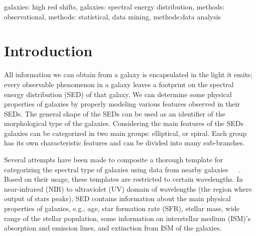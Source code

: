 \documentclass[useAMS,usenatbib]{mn2e}
\begin{document}
\begin{keywords} 
 galaxies: high red shifts, galaxies: spectral energy distribution, methods: observational, methods: statistical, data mining, methods:data analysis
\end{keywords}
\section{Introduction}
\label{sec: intro}
All information we can obtain from a galaxy is encapsulated in the light it emits; every observable phenomenon in a galaxy leaves a footprint on the spectral energy distribution (SED) of that galaxy.
We can determine some physical properties of galaxies by properly modeling various features observed in their SEDs.
The general shape of the SEDs can be used as an identifier of the morphological type of the galaxies.
Considering the main features of the SEDs galaxies can be categorized in two main groups: elliptical, or spiral.
Each group has its own characteristic features and can be divided into many sub-branches.

Several attempts have been made to composite a thorough template for categorizing the spectral type of galaxies using data from nearby galaxies~\citep[e.g.][]{Kinney93}~\citep[][hereafter K96]{Kinney96}~\citep[][]{Bershady00,Mannucci01}. 
Based on their usage, these templates are restricted to certain wavelengths.
In near-infrared (NIR) to ultraviolet (UV) domain of wavelengths (the region where output of stars peaks), SED contains information about the main physical properties of galaxies, e.g., age, star formation rate (SFR), stellar mass, wide range of the stellar population, some information on interstellar medium (ISM)'s absorption and emission lines, and extinction from ISM of the galaxies.


\end{document}
